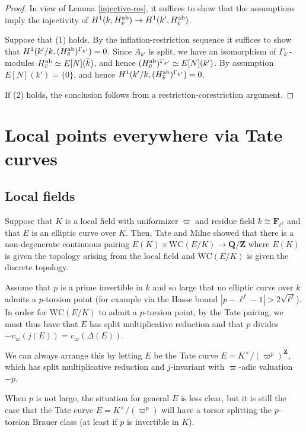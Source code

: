 \documentclass[10pt,letterpaper,twoside]{article}
\renewcommand{\1}{\mathbf{1}}
\newcommand{\bF}{\mathbf{F}}
\newcommand{\bQ}{\mathbf{Q}}
\newcommand{\bZ}{\mathbf{Z}}
\newcommand{\WC}{\mathrm{WC}}
\newcommand{\iso}{\cong}
\theoremstyle{plain}
\theoremstyle{plain}
\theoremstyle{definition}
\theoremstyle{named}
\theoremstyle{definition}
\begin{document}
	\begin{proof}
		In view of Lemma \ref{injective-res}, it suffices to show that the assumptions imply the injectivity of $H^1(k,H^{\mathrm{ab}}_{\Bar{v}})\to H^1(k',H^{\mathrm{ab}}_{\Bar{v}})$. 
		
		Suppose that (1) holds. By the inflation-restriction sequence it suffices to show that $H^1(k'/k,(H^{\mathrm{ab}}_{\Bar{v}})^{\Gamma_{k'}})=0$. Since $A_{k'}$ is split, we have an isomorphism of $\Gamma_{k'}$-modules $H^{\mathrm{ab}}_{\Bar{v}}\simeq E[N](\Bar{k})$, and hence  $(H^{\mathrm{ab}}_{\Bar{v}})^{\Gamma_{k'}}\simeq E[N](k')$. By assumption $E[N](k')=\{0\}$, and hence $H^1(k'/k,(H^{\mathrm{ab}}_{\Bar{v}})^{\Gamma_{k'}})=0$.
		
		If (2) holds, the conclusion follows from a restriction-corestriction argument.
	\end{proof}
	

\section{Local points everywhere via Tate curves}

\subsection{Local fields}

Suppose that $K$ is a local field with uniformizer $\varpi$ and residue field $k\iso\bF_{\ell^f}$ and that $E$ is an elliptic curve over $K$. Then, Tate and Milne 
showed that there is a non-degenerate continuous pairing $E(K)\times\WC(E/K)\rightarrow\bQ/\bZ$
where $E(K)$ is given the topology arising from the local field and $\WC(E/K)$ is given the discrete
topology.

Assume that $p$ is a prime invertible in $k$ and so large that no elliptic curve over $k$ admits
a $p$-torsion point (for example via the Hasse bound $|p-\ell^f-1|>2\sqrt{\ell^f}$).
In order for $\WC(E/K)$ to admit a $p$-torsion point, by the Tate pairing, we must thus have that
$E$ has split multiplicative
reduction and that $p$ divides $-v_{\varpi}(j(E))=v_\varpi(\Delta(E))$.

We can always arrange this by letting $E$ be the Tate curve
$E=K^\times/(\varpi^p)^{\bZ}$, which has split multiplicative reduction
and $j$-invariant with $\varpi$-adic valuation $-p$.

When $p$ is not large, the situation for general $E$ is less clear, but it is still the case that the Tate curve
$E=K^\times/(\varpi^p)$ will have a torsor splitting the $p$-torsion Brauer class (at least if $p$
is invertible in $K$).
\end{document}
